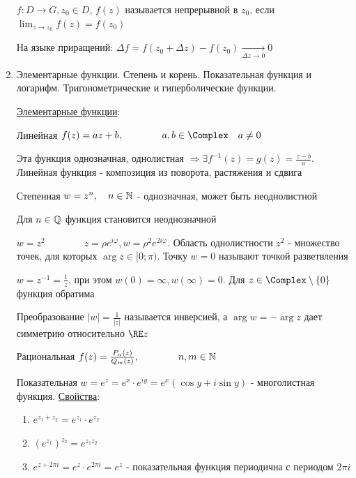 \documentclass[12pt]{article}
\begin{document}
\begin{enumerate}
     $f : D \longrightarrow G, z_0 \in D$, $f(z)$ называется непрерывной в $z_0$, если $\lim_{z \to z_0} f(z) = f(z_0)$

    На языке приращений: $\Delta f = f(z_0 + \Delta z) - f(z_0) \underset{\Delta z \to 0}{\longrightarrow} 0$

    \item Элементарные функции. Степень и корень. Показательная функция и логарифм. Тригонометрические и гиперболические функции.

    \hyperlink{elementary_functions}{Элементарные функции}:

     Линейная $f(z) = az + b, \qquad\qquad a, b \in \Complex \quad a \neq 0$

    Эта функция однозначная, однолистная $\Longrightarrow \exists f^{-1}(z) = g(z) = \frac{z - b}{a}$. 
    Линейная функция - композиция из поворота, растяжения и сдвига
    
     Степенная $w = z^n, \quad n \in \mathbb{N}$ - однозначная, может быть неоднолистной
    
    Для $n \in \mathbb{Q}$ функция становится неоднозначной
    
    \Exs $w = z^2 \qquad\qquad z = \rho e^{i\varphi}, w = \rho^2 e^{2i\varphi}$. Область однолистности $z^2$ - множество точек, для которых $\arg z \in [0; \pi)$.
    Точку $w = 0$ называют точкой разветвления
    
    \Exs $w = z^{-1} = \frac{1}{z}$, при этом $w(0) = \infty, w(\infty) = 0$.    
    Для $z \in \Complex \setminus \{0\}$ функция обратима
    
    Преобразование $|w| = \frac{1}{|z|}$ называется инверсией, а $\arg w = -\arg z$ дает симметрию относительно $\RE z$
    
     Рациональная $f(z) = \frac{P_n(z)}{Q_m(z)}, \qquad\qquad n, m \in \mathbb{N}$
    
     Показательная $w = e^z = e^x \cdot e^{iy} = e^x (\cos y + i \sin y)$ - многолистная функция. \underline{Свойства}: 
    
    \begin{enumerate}
        \item $e^{z_1 + z_2} = e^{z_1} \cdot e^{z_2}$
        \item $\left(e^{z_1}\right)^{z_2} = e^{z_1 z_2}$
        \item $e^{z + 2\pi i} = e^{z} \cdot e^{2\pi i} = e^z$ - показательная функция периодична с периодом $2\pi i$
    \end{enumerate}
    

\end{enumerate}
\end{document}
